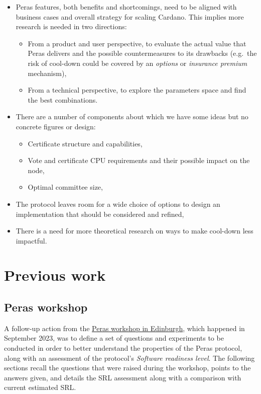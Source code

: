 \documentclass[10pt]{article}
\providecommand{\tightlist}{%
  \setlength{\itemsep}{0pt}\setlength{\parskip}{0pt}}
\begin{document}
\begin{itemize}
\tightlist
\item
  Peras features, both benefits and shortcomings, need to be aligned
  with business cases and overall strategy for scaling Cardano. This
  implies more research is needed in two directions:

  \begin{itemize}
  \tightlist
  \item
    From a product and user perspective, to evaluate the actual value
    that Peras delivers and the possible countermeasures to its
    drawbacks (e.g.~the risk of cool-down could be covered by an
    \emph{options} or \emph{insurance premium} mechanism),
  \item
    From a technical perspective, to explore the parameters space and
    find the best combinations.
  \end{itemize}
\item
  There are a number of components about which we have some ideas but no
  concrete figures or design:

  \begin{itemize}
  \tightlist
  \item
    Certificate structure and capabilities,
  \item
    Vote and certificate CPU requirements and their possible impact on
    the node,
  \item
    Optimal committee size,
  \end{itemize}
\item
  The protocol leaves room for a wide choice of options to design an
  implementation that should be considered and refined,
\item
  There is a need for more theoretical research on ways to make
  cool-down less impactful.
\end{itemize}

\newpage

\section{Previous work}\label{previous-work}

\subsection{Peras workshop}\label{peras-workshop}

A follow-up action from the
\href{https://docs.google.com/document/d/1dv796m2Fc7WH38DNmGc68WOXnqtxj7F30o-kGzM4zKA/edit}{Peras
workshop in Edinburgh}, which happened in September 2023, was to define
a set of questions and experiments to be conducted in order to better
understand the properties of the Peras protocol, along with an
assessment of the protocol's \emph{Software readiness level}. The
following sections recall the questions that were raised during the
workshop, points to the answers given, and details the SRL assessment
along with a comparison with current estimated SRL.
\end{document}
